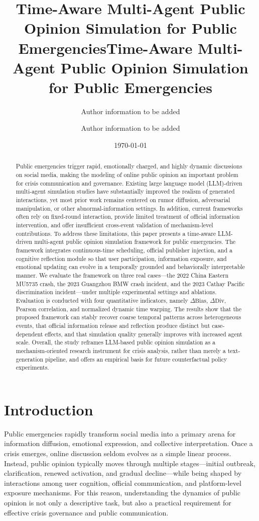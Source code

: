 \documentclass[11pt]{article}
\title{Time-Aware Multi-Agent Public Opinion Simulation for Public Emergencies}
\author{Author information to be added}
\date{}
\title{Time-Aware Multi-Agent Public Opinion Simulation for Public Emergencies}
\author{Author information to be added}
\date{\today}
\begin{document}
\maketitle

\begin{abstract}
Public emergencies trigger rapid, emotionally charged, and highly dynamic discussions on social media, making the modeling of online public opinion an important problem for crisis communication and governance. Existing large language model (LLM)-driven multi-agent simulation studies have substantially improved the realism of generated interactions, yet most prior work remains centered on rumor diffusion, adversarial manipulation, or other abnormal-information settings. In addition, current frameworks often rely on fixed-round interaction, provide limited treatment of official information intervention, and offer insufficient cross-event validation of mechanism-level contributions. To address these limitations, this paper presents a time-aware LLM-driven multi-agent public opinion simulation framework for public emergencies. The framework integrates continuous-time scheduling, official publisher injection, and a cognitive reflection module so that user participation, information exposure, and emotional updating can evolve in a temporally grounded and behaviorally interpretable manner. We evaluate the framework on three real cases---the 2022 China Eastern MU5735 crash, the 2023 Guangzhou BMW crash incident, and the 2023 Cathay Pacific discrimination incident---under multiple experimental settings and ablations. Evaluation is conducted with four quantitative indicators, namely $\Delta\mathrm{Bias}$, $\Delta\mathrm{Div}$, Pearson correlation, and normalized dynamic time warping. The results show that the proposed framework can stably recover coarse temporal patterns across heterogeneous events, that official information release and reflection produce distinct but case-dependent effects, and that simulation quality generally improves with increased agent scale. Overall, the study reframes LLM-based public opinion simulation as a mechanism-oriented research instrument for crisis analysis, rather than merely a text-generation pipeline, and offers an empirical basis for future counterfactual policy experiments.
\end{abstract}

\section{Introduction}
Public emergencies rapidly transform social media into a primary arena for information diffusion, emotional expression, and collective interpretation. Once a crisis emerges, online discussion seldom evolves as a simple linear process. Instead, public opinion typically moves through multiple stages---initial outbreak, clarification, renewed activation, and gradual decline---while being shaped by interactions among user cognition, official communication, and platform-level exposure mechanisms. For this reason, understanding the dynamics of public opinion is not only a descriptive task, but also a practical requirement for effective crisis governance and public communication.
\end{document}
